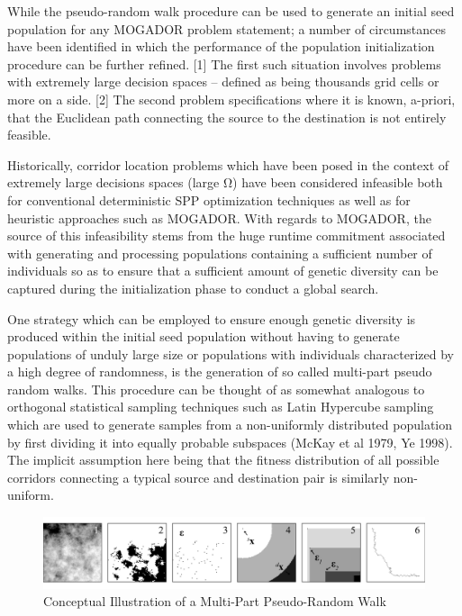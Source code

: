 While the pseudo-random walk procedure can be used to generate an initial seed population for any MOGADOR problem statement; a number of circumstances have been identified in which the performance of the population initialization procedure can be further refined. [1] The first such situation involves problems with extremely large decision spaces – defined as being thousands grid cells or more on a side. [2] The second problem specifications where it is known, a-priori, that the Euclidean path connecting the source to the destination is not entirely feasible.
            
Historically, corridor location problems which have been posed in the context of extremely large decisions spaces (large Ω) have been considered infeasible both for conventional deterministic SPP optimization techniques as well as for heuristic approaches such as MOGADOR. With regards to MOGADOR, the source of this infeasibility stems from the huge runtime commitment associated with generating and processing populations containing a sufficient number of individuals so as to ensure that a sufficient amount of genetic diversity can be captured during the initialization phase to conduct a global search. 

One strategy which can be employed to ensure enough genetic diversity is produced within the initial seed population without having to generate populations of unduly large size or populations with individuals characterized by a high degree of randomness, is the generation of so called multi-part pseudo random walks. This procedure can be thought of as somewhat analogous to orthogonal statistical sampling techniques such as Latin Hypercube sampling which are used to generate samples from a non-uniformly distributed population by first dividing it into equally probable subspaces (McKay et al 1979, Ye 1998). The implicit assumption here being that the fitness distribution of all possible corridors connecting a typical source and destination pair is similarly non-uniform.
            
            \begin{figure}[!h]
            \centering
            \includegraphics[width=5.5in]{figures/multi-part-pseudo-random-walk-example.png}
            \caption[Conceptual Illustration of a Multi-Part Pseudo-Random Walk]{Conceptual Illustration of a Multi-Part Pseudo-Random Walk}
            \label{fig:multi-part-pseudo-random-walk-example}
            \end{figure}
            

